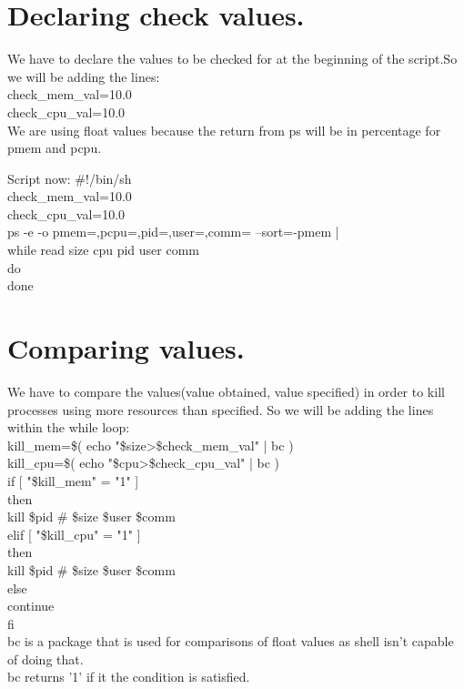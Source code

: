 \documentclass[12pt,a4paper]{article}
\begin{document}
\section{Declaring check values.}

We have to declare the values to be checked for at the beginning of the script.So we will be adding the lines:\\
check\_mem\_val=10.0\\
check\_cpu\_val=10.0\\
We are using float values because the return from ps will be in percentage for pmem and pcpu.
\newline
\begin{flushleft}
Script now:
\newline
\#!/bin/sh\\
check\_mem\_val=10.0\\
check\_cpu\_val=10.0\\
ps -e -o pmem=,pcpu=,pid=,user=,comm= --sort=-pmem |\\
  while read size cpu pid user comm\\
  do\\
  done\\
\end{flushleft}
\newpage
\section{Comparing values.}

We have to compare the values(value obtained, value specified) in order to kill processes using more resources than specified. So we will be adding the lines within the while loop:\\
kill\_mem=\$( echo "\$size>\$check\_mem\_val" | bc )\\
kill\_cpu=\$( echo "\$cpu>\$check\_cpu\_val" | bc )\\
 if [ "\$kill\_mem" = "1" ]\\
      then\\
        kill \$pid \# \$size \$user \$comm\\
      elif [ "\$kill\_cpu" = "1" ]\\
      then\\
        kill \$pid \# \$size \$user \$comm\\
      else\\
        continue\\
      fi\\
bc is a package that is used for comparisons of float values as shell isn't capable of doing that.\\ bc returns '1' if it the condition is satisfied.
\end{document}
